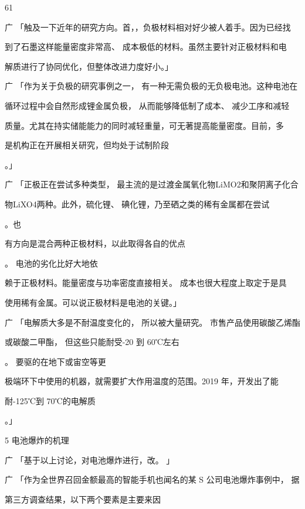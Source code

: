 61\par
广 「触及一下近年的研究方向。首，，负极材料相对好少被人着手。因为已经找\par
到了石墨这样能量密度非常高、 成本极低的材料。虽然主要针对正极材料和电\par
解质进行了协同优化，但整体改进力度好小。」\par
广 「作为关于负极的研究事例之一， 有一种无需负极的无负极电池。这种电池在\par
循环过程中会自然形成锂金属负极， 从而能够降低制了成本、 减少工序和减轻\par
质量。尤其在持实储能能力的同时减轻重量，可无著提高能量密度。目前，多\par
是机构正在开展相关研究，但均处于试制阶段\par
[9]\par
。」\par
广 「正极正在尝试多种类型， 最主流的是过渡金属氧化物LiMO2和聚阴离子化合\par
物LiXO4两种。此外，硫化锂、 碘化锂，乃至硒之类的稀有金属都在尝试\par
[6]\par
。也\par
有方向是混合两种正极材料，以此取得各自的优点\par
[10]\par
。 电池的劣化比好大地依\par
赖于正极材料。能量密度与功率密度直接相关。 成本也很大程度上取定于是具\par
使用稀有金属。可以说正极材料是电池的关键。」\par
广 「电解质大多是不耐温度变化的， 所以被大量研究。 市售产品使用碳酸乙烯酯\par
或碳酸二甲酯， 但这些只能耐受-20 到 60℃左右\par
[11]\par
。 要驱的在地下或宙空等更\par
极端环下中使用的机器，就需要扩大作用温度的范围。2019 年，开发出了能\par
耐-125℃到 70℃的电解质\par
[12]\par
。」\par
5 电池爆炸的机理\par
广 「基于以上讨论，对电池爆炸进行，改。 」\par
广 「作为全世界召回金额最高的智能手机也闻名的某 S 公司电池爆炸事例中， 据\par
第三方调查结果，以下两个要素是主要来因\par
[13]\par
